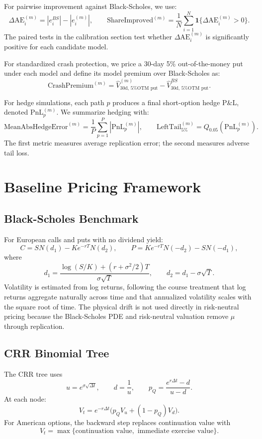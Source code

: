 \documentclass[11pt]{article}
\begin{document}
For pairwise improvement against Black-Scholes, we use:
\[
\Delta \mathrm{AE}_i^{(m)}
=
\left|e_i^{BS}\right|-\left|e_i^{(m)}\right|,
\qquad
\mathrm{ShareImproved}^{(m)}
=
\frac{1}{N}\sum_{i=1}^{N}\mathbf{1}\{\Delta \mathrm{AE}_i^{(m)}>0\}.
\]
The paired tests in the calibration section test whether $\Delta \mathrm{AE}_i^{(m)}$ is significantly positive for each candidate model.

For standardized crash protection, we price a 30-day 5\% out-of-the-money put under each model and define its model premium over Black-Scholes as:
\[
\mathrm{CrashPremium}^{(m)}
=
\widehat{V}^{(m)}_{\text{30d, 5\% OTM put}}
-
\widehat{V}^{BS}_{\text{30d, 5\% OTM put}}.
\]

For hedge simulations, each path $p$ produces a final short-option hedge P\&L, denoted $\mathrm{PnL}_p^{(m)}$. We summarize hedging with:
\[
\mathrm{MeanAbsHedgeError}^{(m)}
=
\frac{1}{P}\sum_{p=1}^{P}\left|\mathrm{PnL}_p^{(m)}\right|,
\qquad
\mathrm{LeftTail}_{5\%}^{(m)}
=
Q_{0.05}\left(\mathrm{PnL}_p^{(m)}\right).
\]
The first metric measures average replication error; the second measures adverse tail loss.

\section{Baseline Pricing Framework}

\subsection{Black-Scholes Benchmark}

For European calls and puts with no dividend yield:
\[
C=SN(d_1)-Ke^{-rT}N(d_2),\qquad
P=Ke^{-rT}N(-d_2)-SN(-d_1),
\]
where
\[
d_1=\frac{\log(S/K)+(r+\sigma^2/2)T}{\sigma\sqrt{T}},
\qquad
d_2=d_1-\sigma\sqrt{T}.
\]
Volatility is estimated from log returns, following the course treatment that log returns aggregate naturally across time and that annualized volatility scales with the square root of time. The physical drift is not used directly in risk-neutral pricing because the Black-Scholes PDE and risk-neutral valuation remove $\mu$ through replication.

\subsection{CRR Binomial Tree}

The CRR tree uses
\[
u=e^{\sigma\sqrt{\Delta t}},\qquad
d=\frac{1}{u},\qquad
p_Q=\frac{e^{r\Delta t}-d}{u-d}.
\]
At each node:
\[
V_t=e^{-r\Delta t}\bigl(p_QV_u+(1-p_Q)V_d\bigr).
\]
For American options, the backward step replaces continuation value with
\[
V_t=\max\{\text{continuation value},\text{ immediate exercise value}\}.
\]
\end{document}
